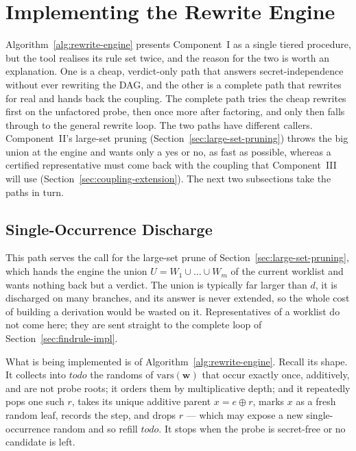 \section{Implementing the Rewrite Engine}
\label{sec:rewrite-engine-impl}

Algorithm~\ref{alg:rewrite-engine} presents Component~I as a single tiered
procedure, but the tool realises its rule set twice, and the reason for the two
is worth an explanation. One is a cheap, verdict-only path that answers
secret-independence without ever rewriting the DAG, and the other is a complete
path that rewrites for real and hands back the coupling. The complete path tries
the cheap rewrites first on the
unfactored probe, then once more after factoring, and only then falls through to
the general rewrite loop. The two paths
have different callers. Component~II's large-set pruning
(Section~\ref{sec:large-set-pruning}) throws the big union at the engine and wants
only a yes or no, as fast as possible, whereas a certified representative must
come back with the coupling that Component~III will use
(Section~\ref{sec:coupling-extension}). The next two subsections take the paths
in turn.

  \subsection{Single-Occurrence Discharge}
  \label{sec:refcount-impl}

  This path serves the call for the large-set prune of
  Section~\ref{sec:large-set-pruning}, which hands the engine the union
  $U = W_1 \cup \dots \cup W_m$ of the current worklist and wants nothing back but
  a verdict. The union is typically far larger than $d$, it is discharged on many
  branches, and its answer is never extended, so the whole cost of building a
  derivation would be wasted on it. Representatives of a worklist do not come here;
  they are sent straight to the complete loop of
  Section~\ref{sec:findrule-impl}.

  What is being implemented is  of
  Algorithm~\ref{alg:rewrite-engine}. Recall its shape. It collects into
  $\mathit{todo}$ the randoms of $\mathrm{vars}(\mathbf{w})$ that occur exactly
  once, additively, and are not probe roots; it orders them by multiplicative
  depth; and it repeatedly pops one such $r$, takes its unique
  additive parent $x = e \oplus r$, marks $x$ as a fresh random leaf, records the
  step, and drops $r$ --- which may expose a new single-occurrence random and so
  refill $\mathit{todo}$. It stops when the probe is secret-free or no candidate is
  left.


